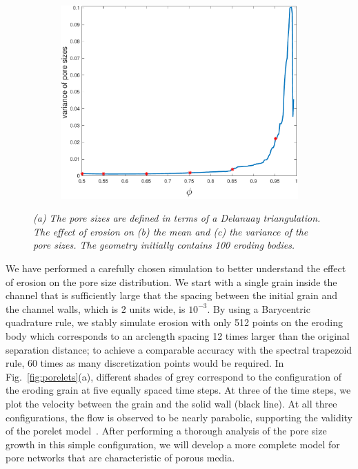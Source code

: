 \documentclass[11pt]{article}
\begin{document}
\begin{figure}[htp]
\begin{subfigure}[b]{0.33\textwidth}
  \includegraphics*[height=0.8\linewidth]{figs/gap_variance}
\caption{}
\end{subfigure}
  \caption{\label{fig:Eroding100gap_mean_var} \em (a) The pore sizes are defined in terms of a Delanuay triangulation. The effect of erosion on (b) the mean and (c) the variance of the pore sizes. The geometry initially contains 100 eroding bodies.}
\end{figure}


We have performed a carefully chosen simulation to better understand the effect of erosion on the pore size distribution. We start with a single grain inside the channel that is sufficiently large that the spacing between the initial grain and the channel walls, which is 2 units wide, is $10^{-3}$. By using a Barycentric quadrature rule, we stably simulate erosion with only 512 points on the eroding body which corresponds to an arclength spacing 12 times larger than the original separation distance; to achieve a comparable accuracy with the spectral trapezoid rule, 60 times as many discretization points would be required. In Fig.~\ref{fig:porelets}(a), different shades of grey correspond to the configuration of the eroding grain at five equally spaced time steps. At three of the time steps, we plot the velocity between the grain and the solid wall (black line). At all three configurations, the flow is observed to be nearly parabolic, supporting the validity of the porelet model~\cite{dea-qua-bir-jua2018}. After performing a thorough analysis of the pore size growth in this simple configuration, we will develop a more complete model for pore networks that are characteristic of porous media.
\end{document}
